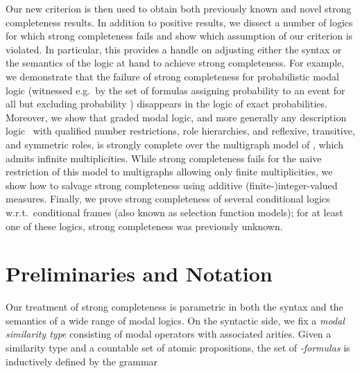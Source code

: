 \documentclass[proceedings]{stacs}
\theoremstyle{definition}
\theoremstyle{plain}
\begin{document}
Our new criterion is then used to obtain both previously known and
novel strong completeness results. In addition to positive results, we
dissect a number of logics for which strong completeness fails and
show which assumption of our criterion is violated. In particular,
this provides a handle on adjusting either the syntax or the semantics
of the logic at hand to achieve strong completeness.
For example, we demonstrate that the failure of strong
completeness for probabilistic modal logic (witnessed e.g.\ by the set
of formulas assigning probability  to an event for all 
but excluding probability ) disappears in the logic of exact
probabilities.  Moreover, we show that graded modal logic, and more
generally any description logic~\cite{BaaderEA03} with qualified
number restrictions, role hierarchies, and reflexive, transitive, and
symmetric roles, is strongly complete over the multigraph model of
\cite{DAgostinoVisser02}, which admits infinite multiplicities. While
strong completeness fails for the naive restriction of this model to
multigraphs allowing only finite multiplicities, we show how to
salvage strong completeness using additive
\mbox{(finite-)integer}-valued measures. Finally, we prove strong
completeness of several conditional logics w.r.t.\ conditional frames
(also known as selection function models); for at least one of these
logics, strong completeness was previously unknown.




\section{Preliminaries and Notation}

\noindent Our treatment of strong completeness is parametric in both
the syntax and the semantics of a wide range of modal logics. On the
syntactic side, we fix a \emph{modal similarity type} 
consisting of modal operators with associated arities. Given a
similarity type  and a countable set  of
atomic propositions, the set  of
\emph{-formulas} is inductively defined by the grammar
\end{document}
